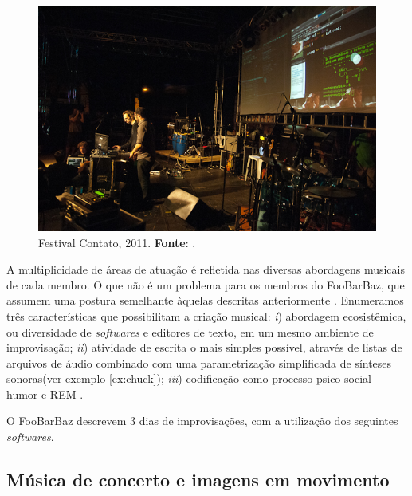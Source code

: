 \begin{figure}[!h]
  \centering
  \includegraphics[scale=0.5]{imagens/Foobarbaz1.jpg}
  \caption{Festival Contato, 2011. \textbf{Fonte}: .}
  \label{fig:foobarbaz}
\end{figure}

A multiplicidade de áreas de atuação é refletida nas diversas abordagens musicais de cada membro. O que não é um problema para os membros do FooBarBaz, que assumem uma postura semelhante àquelas descritas anteriormente . Enumeramos três características que possibilitam a criação musical: \emph{i}) abordagem ecosistêmica, ou diversidade de \emph{softwares} e editores de texto, em um mesmo ambiente de improvisação; \emph{ii}) atividade de escrita o mais simples possível, através de listas de arquivos de áudio combinado com uma parametrização simplificada de sínteses sonoras(ver exemplo \ref{ex:chuck}); \emph{iii}) codificação como processo psico-social -- humor e REM . 

O FooBarBaz descrevem 3 dias de improvisações, com a utilização dos seguintes \emph{softwares}.



\subsection{Música de concerto e imagens em movimento}\label{sec:concerto}

